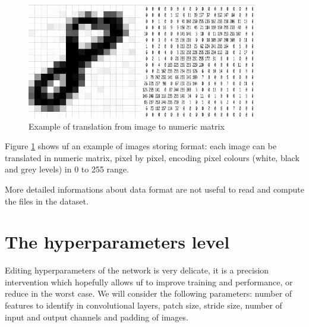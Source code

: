 \begin{figure}
	\centering
	\includegraphics[width=0.9\textwidth]{Images/image_to_matrix}
	\caption{Example of translation from image to numeric matrix}
	\label{fig:image_to_matrix}
\end{figure}

Figure \ref{fig:image_to_matrix} shows uf an example of images storing format: each image can be translated in numeric matrix, pixel by pixel, encoding pixel colours (white, black and grey levels) in 0 to 255 range.

More detailed informations about data format are not useful to read and compute the files in the dataset.

\section{The hyperparameters level}

Editing hyperparameters of the network is very delicate, it is a precision intervention which hopefully allows uf to improve training and performance, or reduce in the worst case. We will consider the following parameters: number of features to identify in convolutional layers, patch size, stride size, number of input and output channels and padding of images.

